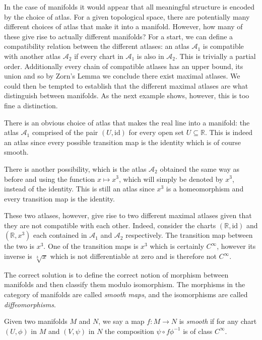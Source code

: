 \documentclass[12pt,oneside]{book}
\numberwithin{table}{section}
\numberwithin{equation}{section}
\numberwithin{figure}{section}
\newcommand{\R}{\mathbb{R}}
\newcommand{\A}{\mathcal{A}}
\newcommand{\id}{\mathrm{id}}
\begin{document}
In the case of manifolds it would appear that all meaningful structure is encoded by the choice of atlas. For a given topological space, there are potentially many different choices of atlas that make it into a manifold. However, how many of these give rise to actually different manifolds? For a start, we can define a compatibility relation between the different atlases: an atlas \( \A_1 \) is compatible with another atlas \( \A_2 \) if every chart in \( \A_1 \) is also in \( \A_2 \). This is trivially a partial order. Additionally every chain of compatible atlases has an upper bound, its union and so by Zorn's Lemma we conclude there exist maximal atlases. We could then be tempted to establish that the different maximal atlases are what distinguish between manifolds. As the next example shows, however, this is too fine a distinction.

\begin{exe} \label{ex:different maximal atlases}
	There is an obvious choice of atlas that makes the real line into a manifold: the atlas \( \A_1 \) comprised of the pair \( (U, \id) \) for every open set \( U \subseteq \R \). This is indeed an atlas since every possible transition map is the identity which is of course smooth. 

	There is another possibility, which is the atlas \( \A_2 \) obtained the same way as before and using the function \( x \mapsto x^3 \), which will simply be denoted by \( x^3 \), instead of the identity. This is still an atlas since \( x^3 \) is a homeomorphism and every transition map is the identity.

	These two atlases, however, give rise to two different maximal atlases given that they are not compatible with each other. Indeed, consider the charts \( (\R, \id) \) and \( (\R, x^3) \) each contained in \( \A_1 \) and \( \A_2 \) respectively. The transition map between the two is \( x^3 \). One of the transition maps is \( x^3 \) which is certainly \( C^\infty \), however its inverse is \( \sqrt[3]{x} \) which is not differentiable at zero and is therefore not \( C^{\infty} \).
\end{exe}

The correct solution is to define the correct notion of morphism between manifolds and then classify them modulo isomorphism. The morphisms in the category of manifolds are called \emph{smooth maps}, and the isomorphisms are called \emph{diffeomorphisms}.
\begin{defn}
	Given two manifolds \( M \) and \( N \), we say a map \( f \colon M \to N \) is \emph{smooth} if for any chart \( (U, \phi) \) in \( M \) and \( (V, \psi) \) in \( N \) the composition \( \psi \circ f \phi^{-1} \) is of class \( C^{\infty} \).
\end{defn}
\end{document}
